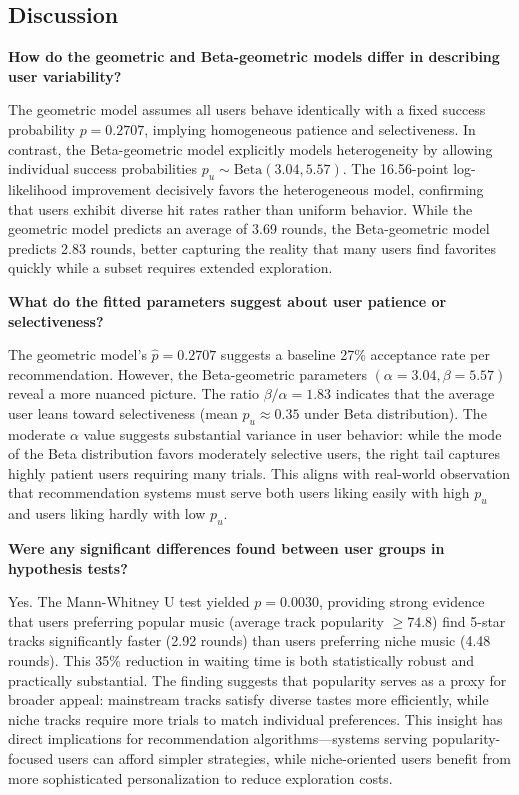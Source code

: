 \documentclass[12pt,a4paper]{article}
\begin{document}
\subsection{Discussion}

\textbf{How do the geometric and Beta-geometric models differ in describing user variability?}

The geometric model assumes all users behave identically with a fixed success probability $p = 0.2707$, implying homogeneous patience and selectiveness. In contrast, the Beta-geometric model explicitly models heterogeneity by allowing individual success probabilities $p_u \sim \text{Beta}(3.04, 5.57)$. The 16.56-point log-likelihood improvement decisively favors the heterogeneous model, confirming that users exhibit diverse hit rates rather than uniform behavior. While the geometric model predicts an average of 3.69 rounds, the Beta-geometric model predicts 2.83 rounds, better capturing the reality that many users find favorites quickly while a subset requires extended exploration.

\textbf{What do the fitted parameters suggest about user patience or selectiveness?}

The geometric model's $\hat{p} = 0.2707$ suggests a baseline 27\% acceptance rate per recommendation. However, the Beta-geometric parameters $(\alpha = 3.04, \beta = 5.57)$ reveal a more nuanced picture. The ratio $\beta/\alpha = 1.83$ indicates that the average user leans toward selectiveness (mean $p_u \approx 0.35$ under Beta distribution). The moderate $\alpha$ value suggests substantial variance in user behavior: while the mode of the Beta distribution favors moderately selective users, the right tail captures highly patient users requiring many trials. This aligns with real-world observation that recommendation systems must serve both users liking easily with high $p_u$ and users liking hardly with low $p_u$.

\textbf{Were any significant differences found between user groups in hypothesis tests?}

Yes. The Mann-Whitney U test yielded $p = 0.0030$, providing strong evidence that users preferring popular music (average track popularity $\geq 74.8$) find 5-star tracks significantly faster (2.92 rounds) than users preferring niche music (4.48 rounds). This 35\% reduction in waiting time is both statistically robust and practically substantial. The finding suggests that popularity serves as a proxy for broader appeal: mainstream tracks satisfy diverse tastes more efficiently, while niche tracks require more trials to match individual preferences. This insight has direct implications for recommendation algorithms—systems serving popularity-focused users can afford simpler strategies, while niche-oriented users benefit from more sophisticated personalization to reduce exploration costs.
\end{document}
